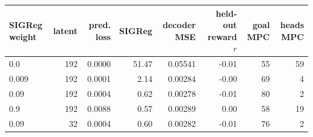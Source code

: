 \begin{tabular}{lrrrrrrr}
\toprule
SIGReg weight & latent & pred. loss & SIGReg & decoder MSE & held-out reward $r$ & goal MPC & heads MPC \\
\midrule
0.0 & 192 & 0.0000 & 51.47 & 0.05541 & -0.01 & 55 & 59 \\
0.009 & 192 & 0.0001 & 2.14 & 0.00284 & -0.00 & 69 & 4 \\
0.09 & 192 & 0.0004 & 0.62 & 0.00278 & -0.01 & 80 & 2 \\
0.9 & 192 & 0.0088 & 0.57 & 0.00289 & 0.00 & 58 & 19 \\
0.09 & 32 & 0.0004 & 0.60 & 0.00282 & -0.01 & 76 & 2 \\
\bottomrule
\end{tabular}
